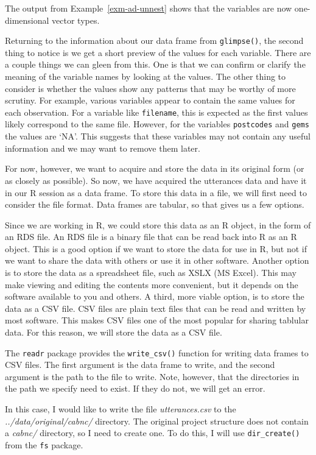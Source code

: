\documentclass[
  letterpaper,
]{latex/krantz}
\theoremstyle{definition}
\theoremstyle{remark}
\begin{document}
The output from Example~\ref{exm-ad-unnest} shows that the variables are
now one-dimensional vector types.

Returning to the information about our data frame from
\texttt{glimpse()}, the second thing to notice is we get a short preview
of the values for each variable. There are a couple things we can gleen
from this. One is that we can confirm or clarify the meaning of the
variable names by looking at the values. The other thing to consider is
whether the values show any patterns that may be worthy of more
scrutiny. For example, various variables appear to contain the same
values for each observation. For a variable like \texttt{filename}, this
is expected as the first values likely correspond to the same file.
However, for the variables \texttt{postcodes} and \texttt{gems} the
values are `NA'. This suggests that these variables may not contain any
useful information and we may want to remove them later.

For now, however, we want to acquire and store the data in its original
form (or as closely as possible). So now, we have acquired the
utterances data and have it in our R session as a data frame. To store
this data in a file, we will first need to consider the file format.
Data frames are tabular, so that gives us a few options.

Since we are working in R, we could store this data as an R object, in
the form of an RDS file. An RDS file is a binary file that can be read
back into R as an R object. This is a good option if we want to store
the data for use in R, but not if we want to share the data with others
or use it in other software. Another option is to store the data as a
spreadsheet file, such as XSLX (MS Excel). This may make viewing and
editing the contents more convenient, but it depends on the software
available to you and others. A third, more viable option, is to store
the data as a CSV file. CSV files are plain text files that can be read
and written by most software. This makes CSV files one of the most
popular for sharing tablular data. For this reason, we will store the
data as a CSV file.

The \texttt{readr} package provides the \texttt{write\_csv()} function
for writing data frames to CSV files. The first argument is the data
frame to write, and the second argument is the path to the file to
write. Note, however, that the directories in the path we specify need
to exist. If they do not, we will get an error.

In this case, I would like to write the file \emph{utterances.csv} to
the \emph{../data/original/cabnc/} directory. The original project
structure does not contain a \emph{cabnc/} directory, so I need to
create one. To do this, I will use \texttt{dir\_create()} from the
\texttt{fs} package.
\end{document}
